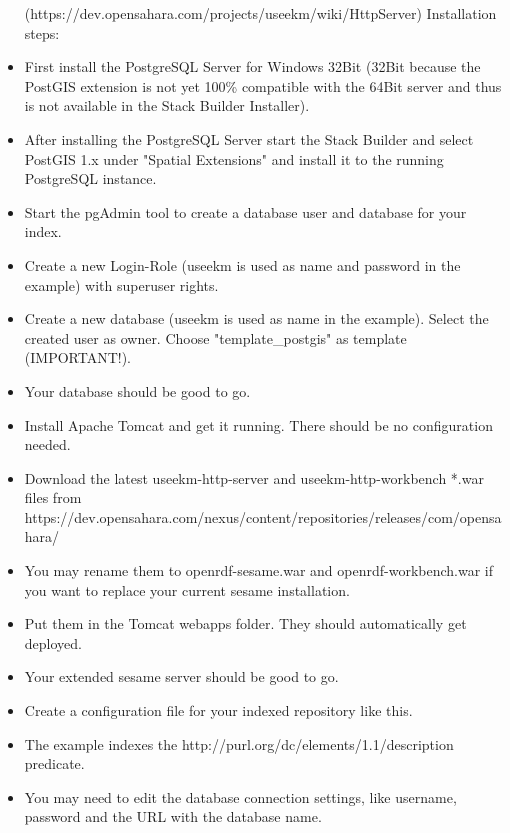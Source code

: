 \begin{itemize}
   (https://dev.opensahara.com/projects/useekm/wiki/HttpServer)
Installation steps:
\item First install the PostgreSQL Server for Windows 32Bit (32Bit because the PostGIS
   extension is not yet 100\% compatible with the 64Bit server and thus is not available in
  the Stack Builder Installer).
\item After installing the PostgreSQL Server start the Stack Builder and select PostGIS 1.x
   under "Spatial Extensions" and install it to the running PostgreSQL instance.
\item Start the pgAdmin tool to create a database user and database for your index.
\item Create a new Login-Role (useekm is used as name and password in the example)
   with superuser rights.
\item Create a new database (useekm is used as name in the example). Select the created
   user as owner. Choose "template\_postgis" as template (IMPORTANT!).
\item Your database should be good to go.
\item Install Apache Tomcat and get it running. There should be no configuration needed.
\item Download the latest useekm-http-server and useekm-http-workbench *.war files from
   https://dev.opensahara.com/nexus/content/repositories/releases/com/opensahara/
\item You may rename them to openrdf-sesame.war and openrdf-workbench.war if you
   want to replace your current sesame installation.
\item Put them in the Tomcat webapps folder. They should automatically get deployed.
\item Your extended sesame server should be good to go.
\item Create a configuration file for your indexed repository like this.
\item The example indexes the http://purl.org/dc/elements/1.1/description predicate.
\item You may need to edit the database connection settings, like username, password and
   the URL with the database name.
\end{itemize}


